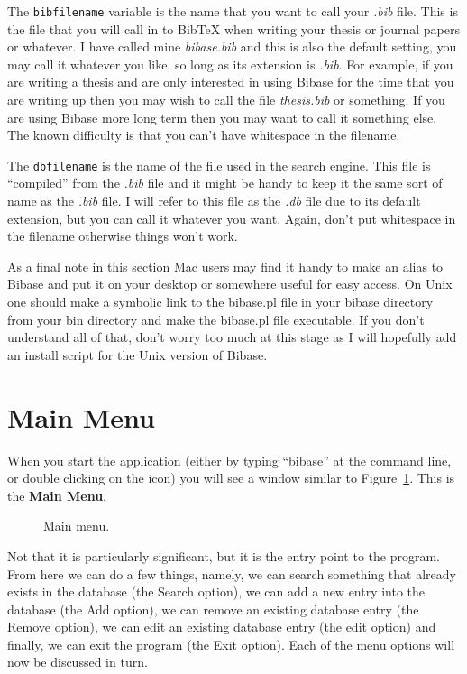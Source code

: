 \documentclass[12pt,a4paper]{book}
\newcommand {\fig}[1] {Figure~\ref{#1}}
\begin{document}
The {\tt bibfilename} variable is the name that you want to call your 
\emph{.bib} file.  This is the file that you will call in to BibTeX when 
writing your thesis or journal papers or whatever.  I have called mine 
\emph{bibase.bib} and this is also the default setting, you may call 
it whatever you like, so long as its extension is \emph{.bib}.  For 
example, if you are writing a thesis and are only interested in using 
Bibase for the time that you are writing up then you may wish to call 
the file \emph{thesis.bib} or something.  If you are using Bibase 
more long term then you may want to call it something else.  The known 
difficulty is that you can't have whitespace in the filename.

The {\tt dbfilename} is the name of the file used in the search 
engine.  This file is ``compiled'' from the \emph{.bib} file and it 
might be handy to keep it the same sort of name as the \emph{.bib} 
file.  I will refer to this file as the \emph{.db} file due to its 
default extension, but you can call it whatever you want.  Again, 
don't put whitespace in the filename otherwise things won't work.

As a final note in this section Mac users may find it handy to make an 
alias to Bibase and put it on 
your desktop or somewhere useful for easy access.  On Unix one should 
make a symbolic link to the bibase.pl file in your bibase directory 
from your bin directory and make the bibase.pl file executable.  If 
you don't understand all of that, don't worry too much at this stage 
as I will hopefully add an install script for the Unix version of 
Bibase.

\section{Main Menu}

When you start the application (either by typing ``bibase'' at the 
command line, or double clicking on the icon) you will see a window 
similar to \fig{fig:mainMenu}.  This is the {\bf Main Menu}.
\begin{figure}
\centerline{}
\caption{Main menu.}
\label{fig:mainMenu}
\end{figure}
Not that it is particularly significant, but it is the entry point to 
the program.  From here we can do a few things, namely, we can search 
something that already exists in the database (the Search option), we 
can add a new entry into the database (the Add option), we can remove 
an existing database entry (the Remove option), we can edit an existing 
database entry (the edit
option) and finally, we can exit the 
program (the Exit option).  Each of the menu options will now be 
discussed in turn.
\end{document}
